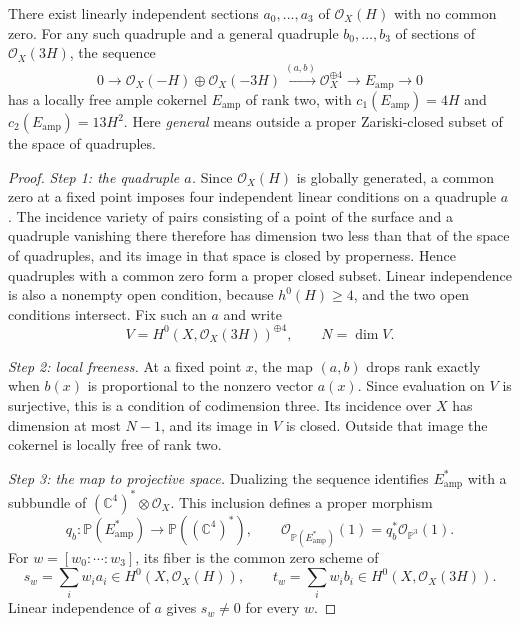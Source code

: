 \begin{proposition}\label{prop:hirzebruch-ample-comparison}
There exist linearly independent sections $a_0,\ldots,a_3$ of $\mathcal O_X(H)$ with no common zero. For any such quadruple and a general quadruple $b_0,\ldots,b_3$ of sections of $\mathcal O_X(3H)$, the sequence
\[
 0\longrightarrow\mathcal O_X(-H)\oplus\mathcal O_X(-3H)
 \xrightarrow{(a,b)}\mathcal O_X^{\oplus4}
 \longrightarrow E_{\mathrm{amp}}\longrightarrow0
\]
has a locally free ample cokernel $E_{\mathrm{amp}}$ of rank two, with $c_1(E_{\mathrm{amp}})=4H$ and $c_2(E_{\mathrm{amp}})=13H^2$. Here \emph{general} means outside a proper Zariski-closed subset of the space of quadruples.
\end{proposition}
\begin{proof}
\emph{Step 1: the quadruple $a$.} Since $\mathcal O_X(H)$ is globally generated, a common zero at a fixed point imposes four independent linear conditions on a quadruple $a$. The incidence variety of pairs consisting of a point of the surface and a quadruple vanishing there therefore has dimension two less than that of the space of quadruples, and its image in that space is closed by properness. Hence quadruples with a common zero form a proper closed subset. Linear independence is also a nonempty open condition, because $h^0(H)\geq4$, and the two open conditions intersect. Fix such an $a$ and write
\[
 V=H^0(X,\mathcal O_X(3H))^{\oplus4},\qquad N=\dim V.
\]

\emph{Step 2: local freeness.} At a fixed point $x$, the map $(a,b)$ drops rank exactly when $b(x)$ is proportional to the nonzero vector $a(x)$. Since evaluation on $V$ is surjective, this is a condition of codimension three. Its incidence over $X$ has dimension at most $N-1$, and its image in $V$ is closed. Outside that image the cokernel is locally free of rank two.

\emph{Step 3: the map to projective space.} Dualizing the sequence identifies $E_{\mathrm{amp}}^*$ with a subbundle of $(\mathbb C^4)^*\otimes\mathcal O_X$. This inclusion defines a proper morphism
\[
 q_b\colon\mathbb P(E_{\mathrm{amp}}^*)\longrightarrow
 \mathbb P((\mathbb C^4)^*),
 \qquad \mathcal O_{\mathbb P(E_{\mathrm{amp}}^*)}(1)
 =q_b^*\mathcal O_{\mathbb P^3}(1).
\]
For $w=[w_0:\cdots:w_3]$, its fiber is the common zero scheme of
\[
 s_w=\sum_iw_i a_i\in H^0(X,\mathcal O_X(H)),
 \qquad t_w=\sum_iw_i b_i\in H^0(X,\mathcal O_X(3H)).
\]
Linear independence of $a$ gives $s_w\neq0$ for every $w$.


\end{proof}
